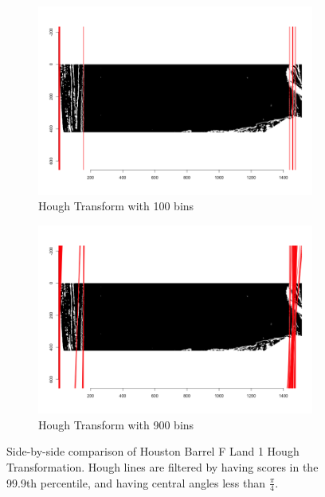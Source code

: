 \documentclass[12pt]{article}
\theoremstyle{nonumberplain}
\begin{document}
\begin{figure}[!ht]
    \centering
      \begin{subfigure}{.5\textwidth}
      \centering
      \includegraphics[width = .9\textwidth]{../images/Houston_BarrelF_Bullet1_Hough_Bin100}
      \caption{Hough Transform with 100 bins}
      \label{fig: hough1}
      \end{subfigure}%
    \begin{subfigure}{.5\textwidth}
      \centering
      \includegraphics[width = .9\textwidth]{../images/Houston_BarrelF_Bullet1_Hough_Bin900}
      \caption{Hough Transform with 900 bins}
      \label{fig: hough2}
      \end{subfigure}
      \caption{Side-by-side comparison of Houston Barrel F Land 1 Hough Transformation. Hough lines are filtered by having scores in the 99.9th percentile, and having central angles less than $\frac{\pi}{4}$.}
      \label{fig: hough-compare}
\end{figure}
\end{document}
